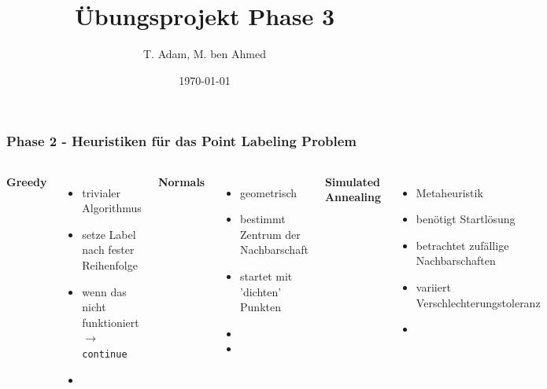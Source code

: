 \documentclass[aspectratio=169]{beamer}
\title[Phase 2]{Übungsprojekt Phase 3} %
\author{T. Adam, M. ben Ahmed} %
\institute[UOS] %
{

Universität Osnabrück \\ %

\medskip
\textit{Æ} %


}
\date{\today} %
\begin{document}
\begin{frame}
\titlepage %
\end{frame}





\begin{frame}
\frametitle{Phase 2 - Heuristiken für das Point Labeling Problem}
\begin{columns}[c] %
	
	\textbf{Greedy}
	\begin{itemize}
		\item trivialer Algorithmus
		\item setze Label nach fester Reihenfolge
		\item wenn das nicht funktioniert $\rightarrow$ \texttt{continue}
		\item []
		
		
	\end{itemize}
	
	\textbf{Normals}
	\begin{itemize}
		\item geometrisch
		\item bestimmt Zentrum der Nachbarschaft
		\item startet mit 'dichten' Punkten
		\item []
		\item []
		
	\end{itemize}
	

	\textbf{Simulated Annealing}
	\begin{itemize}
		\item Metaheuristik
		\item benötigt Startlösung
		\item betrachtet zufällige Nachbarschaften
		\item variiert Verschlechterungstoleranz
		\item []
	\end{itemize}

\end{columns}
\end{frame}
\end{document}
